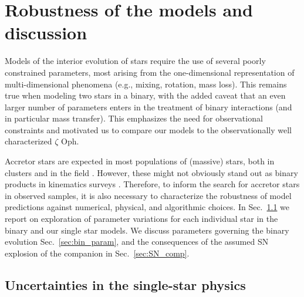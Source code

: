 \documentclass[twocolumn,twocolappendix,trackchanges]{aastex63}
\DeclareRobustCommand{\Secref}[1]{Sec.~\ref{#1}}
\newcommand{\zoph}{$\zeta$ Oph}
\begin{document}
\section{Robustness of the models and discussion}
\label{sec:discussion}

Models of the interior evolution of stars require the use of several
poorly constrained parameters, most arising from the one-dimensional
representation of multi-dimensional phenomena (e.g., mixing,
rotation, mass loss). This remains true when modeling two stars in a
binary, with the added caveat that an even larger number of parameters
enters in the treatment of binary interactions (and in particular mass
transfer). This emphasizes the need for observational constraints and
motivated us to compare our models to the observationally well
characterized \zoph.

Accretor stars are expected in most populations of (massive) stars,
both in clusters \citep[e.g.,][]{chen:09, wang:20} and in the field
\citep[e.g.,][]{demink:11, demink:13, dorigo-jones:20}. However, these might not
obviously stand out as binary products in kinematics surveys
\citep[e.g.,][]{renzo:19walk}. Therefore, to inform the search for
accretor stars in observed samples, it is also necessary to
characterize the robustness of model predictions against numerical,
physical, and algorithmic choices.  In
\Secref{sec:single_star_uncertainties} we report on exploration of
parameter variations for each individual star in the binary and our
single star models. We
discuss parameters governing the binary evolution
\Secref{sec:bin_param}, and the consequences of the assumed SN
explosion of the companion in \Secref{sec:SN_comp}.


\subsection{Uncertainties in the single-star physics}
\label{sec:single_star_uncertainties}
\end{document}
